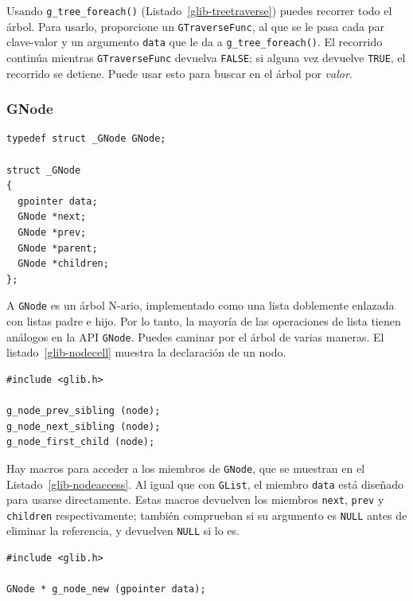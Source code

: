 Usando \lstinline{g_tree_foreach()} (Listado~\ref{glib-treetraverse}) puedes recorrer todo el árbol. Para usarlo, proporcione un \lstinline{GTraverseFunc}, al que se le pasa cada par clave-valor y un argumento \lstinline{data} que le da a \lstinline{g_tree_foreach()}. El recorrido continúa mientras \lstinline{GTraverseFunc} devuelva \lstinline{FALSE}; si alguna vez devuelve \lstinline{TRUE}, el recorrido se detiene. Puede usar esto para buscar en el árbol por \emph{valor}.

\subsubsection{GNode}

\begin{lstlisting}[style=GLib/GTK, caption={Celda \lstinline{GNode}}, label=glib-nodecell]
typedef struct _GNode GNode;

struct _GNode
{
  gpointer data;
  GNode *next;
  GNode *prev;
  GNode *parent;
  GNode *children;
};
\end{lstlisting}

A \lstinline{GNode} es un árbol N-ario, implementado como una lista doblemente enlazada con listas padre e hijo. Por lo tanto, la mayoría de las operaciones de lista tienen análogos en la API \lstinline{GNode}. Puedes caminar por el árbol de varias maneras. El listado~\ref{glib-nodecell} muestra la declaración de un nodo.

\begin{lstlisting}[style=GLib/GTK, caption={Accediendo a \lstinline{GNode}}, label=glib-nodeaccess]
#include <glib.h>

g_node_prev_sibling (node);
g_node_next_sibling (node);
g_node_first_child (node);
\end{lstlisting}

Hay macros para acceder a los miembros de \lstinline{GNode}, que se muestran en el Listado~\ref{glib-nodeaccess}. Al igual que con \lstinline{GList}, el miembro \lstinline{data} está diseñado para usarse directamente. Estas macros devuelven los miembros \lstinline{next}, \lstinline{prev} y \lstinline{children} respectivamente; también comprueban si su argumento es \lstinline{NULL} antes de eliminar la referencia, y devuelven \lstinline{NULL} si lo es.

\begin{lstlisting}[style=GLib/GTK, caption={Creando un \lstinline{GNode}}, label=glib-nodenew]
#include <glib.h>

GNode * g_node_new (gpointer data);
\end{lstlisting}


